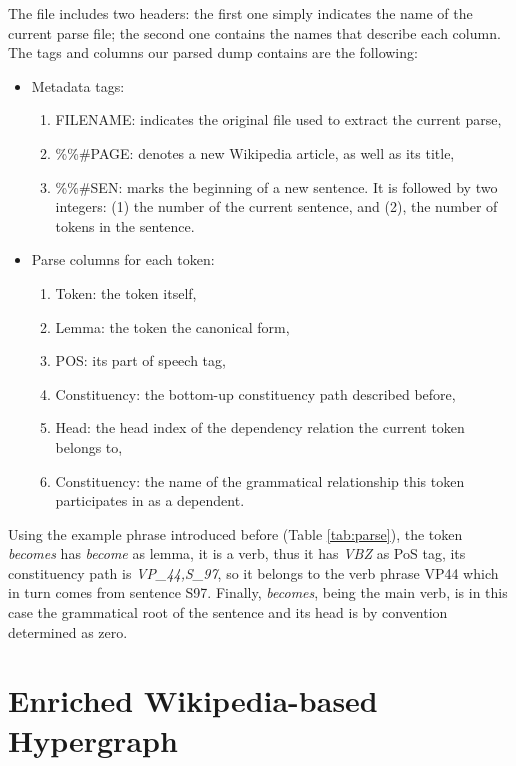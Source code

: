 The file includes two headers: the first one simply indicates the name of the current parse file; the second one contains the names that describe each column. The tags and columns our parsed dump contains are the following:
\begin{itemize}
\item Metadata tags:
\begin{enumerate}
\item {FILENAME}: indicates the original file used to extract the current parse, 
\item {\%\%\#PAGE}: denotes a new Wikipedia article, as well as its title, 
\item {\%\%\#SEN}: marks the beginning of a new sentence. It is followed by two integers: (1) the number of the current sentence, and (2), the number of tokens in the sentence.

\end{enumerate}

\item Parse columns for each token:
\begin{enumerate}
\item Token: the token itself,
\item Lemma: the token the canonical form,
\item POS: its part of speech tag,
\item Constituency: the bottom-up constituency path described before,
\item Head: the head index of the dependency relation the current token belongs to,
\item Constituency: the name of the grammatical relationship this token participates in as a dependent.
\end{enumerate}
\end{itemize}

Using the example phrase introduced before (Table \ref{tab:parse}), the token \textit{becomes} has \textit{become} as lemma, it is a verb, thus it has \textit{VBZ} as PoS tag, its constituency path is \textit{VP\_44,S\_97}, so it belongs to the verb phrase {VP44} which in turn comes from sentence {S97}. Finally, \textit{becomes}, being the main verb, is in this case the grammatical root of the sentence and its head is by convention determined as  zero. 

\section{Enriched Wikipedia-based Hypergraph}

